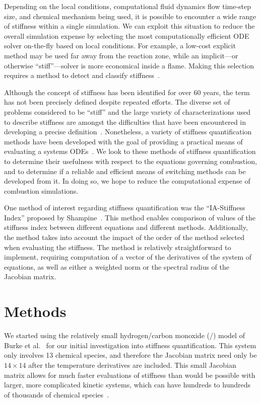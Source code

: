 \documentclass[12pt]{ussci}
\begin{document}
Depending on the local conditions, computational fluid dynamics flow time-step size, and chemical mechanism being used, it is possible to encounter a wide range of stiffness within a single simulation.
We can exploit this situation to reduce the overall simulation expense by selecting the most computationally efficient ODE solver on-the-fly based on local conditions.
For example, a low-cost explicit method may be used far away from the reaction zone, while an implicit---or otherwise ``stiff''---solver is more economical inside a flame.
Making this selection requires a method to detect and classify stiffness~\cite{Niemeyer}.

Although the concept of stiffness has been identified for over 60 years, the term has not been precisely defined despite repeated efforts.
The diverse set of problems considered to be ``stiff'' and the large variety of characterizations used to describe stiffness are amongst the difficulties that have been encountered in developing a precise definition~\cite{Soderlind2014}.
Nonetheless, a variety of stiffness quantification methods have been developed with the goal of providing a practical means of evaluating a systems ODEs~\cite{Soderlind2014,Shampine1985,Brugnano2011,Lambert1973ComputationalEquations,Hairer1996SolvingII}.
We look to these methods of stiffness quantification to determine their usefulness with respect to the equations governing combustion, and to determine if a reliable and efficient means of switching methods can be developed from it.
In doing so, we hope to reduce the computational expense of combustion simulations.

One method of interest regarding stiffness quantification was the ``IA-Stiffness Index'' proposed by Shampine~\cite{Shampine1982}.
This method enables comparison of values of the stiffness index between different equations and different methods.
Additionally, the method takes into account the impact of the order of the method selected when evaluating the stiffness.
The method is relatively straightforward to implement, requiring computation of a vector of the derivatives of the system of equations, as well as either a weighted norm or the spectral radius of the Jacobian matrix.

\section{Methods}
We started using the relatively small hydrogen\slash carbon monoxide (\slash {}) model of Burke et al.~\cite{Burke:2011fh} for our initial investigation into stiffness quantification.
This system only involves 13 chemical species, and therefore the Jacobian matrix need only be $14\times14$ after the temperature derivatives are included.
This small Jacobian matrix allows for much faster evaluations of stiffness than would be possible with larger, more complicated kinetic systems, which can have hundreds to hundreds of thousands of chemical species~\cite{Niemeyer:2013}.
\end{document}
